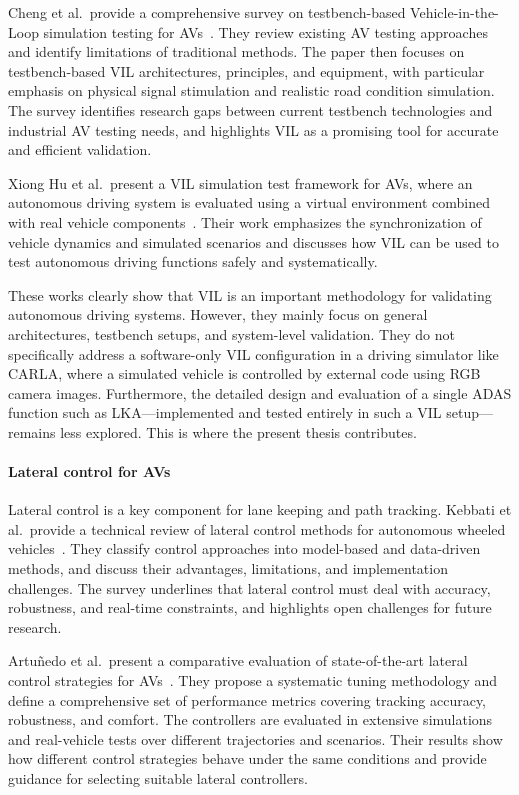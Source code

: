Cheng et al.\ provide a comprehensive survey on testbench-based Vehicle-in-the-Loop simulation testing for \acsp{AV}~\cite{survey_test_bench}. They review existing \ac{AV} testing approaches and identify limitations of traditional methods. The paper then focuses on testbench-based \ac{VIL} architectures, principles, and equipment, with particular emphasis on physical signal stimulation and realistic road condition simulation. The survey identifies research gaps between current testbench technologies and industrial \ac{AV} testing needs, and highlights \ac{VIL} as a promising tool for accurate and efficient validation.

Xiong Hu et al.\ present a \ac{VIL} simulation test framework for \acsp{AV}, where an autonomous driving system is evaluated using a virtual environment combined with real vehicle components~\cite{xiong_hu}. Their work emphasizes the synchronization of vehicle dynamics and simulated scenarios and discusses how \ac{VIL} can be used to test autonomous driving functions safely and systematically.

These works clearly show that \ac{VIL} is an important methodology for validating autonomous driving systems. However, they mainly focus on general architectures, testbench setups, and system-level validation. They do not specifically address a software-only \ac{VIL} configuration in a driving simulator like CARLA, where a simulated vehicle is controlled by external code using RGB camera images. Furthermore, the detailed design and evaluation of a single \acs{ADAS} function such as \ac{LKA}---implemented and tested entirely in such a \ac{VIL} setup---remains less explored. This is where the present thesis contributes.

\paragraph{Lateral control for \acsp{AV}}
Lateral control is a key component for lane keeping and path tracking. Kebbati et al.\ provide a technical review of lateral control methods for autonomous wheeled vehicles~\cite{kebbati}. They classify control approaches into model-based and data-driven methods, and discuss their advantages, limitations, and implementation challenges. The survey underlines that lateral control must deal with accuracy, robustness, and real-time constraints, and highlights open challenges for future research.

Artu\~{n}edo et al.\ present a comparative evaluation of state-of-the-art lateral control strategies for \acsp{AV}~\cite{ARTUNEDO2024100910}. They propose a systematic tuning methodology and define a comprehensive set of performance metrics covering tracking accuracy, robustness, and comfort. The controllers are evaluated in extensive simulations and real-vehicle tests over different trajectories and scenarios. Their results show how different control strategies behave under the same conditions and provide guidance for selecting suitable lateral controllers.


